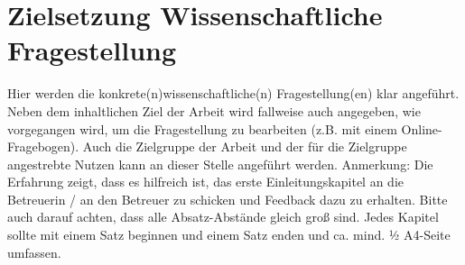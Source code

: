 

\section{Zielsetzung Wissenschaftliche Fragestellung} \label{cha:researchQuestion}

Hier werden die konkrete(n)wissenschaftliche(n) Fragestellung(en) klar angeführt. Neben dem inhaltlichen Ziel der Arbeit wird fallweise auch angegeben, wie vorgegangen wird, um die Fragestellung zu bearbeiten (z.B. mit einem Online-Fragebogen). Auch die Zielgruppe der Arbeit und der für die Zielgruppe angestrebte Nutzen kann an dieser Stelle angeführt werden.
Anmerkung: 
Die Erfahrung zeigt, dass es hilfreich ist, das erste Einleitungskapitel an die Betreuerin / an den Betreuer zu schicken und Feedback dazu zu erhalten.
Bitte auch darauf achten, dass alle Absatz-Abstände gleich groß sind.
Jedes Kapitel sollte mit einem Satz beginnen und einem Satz enden und ca. mind. ½ A4-Seite umfassen. 
